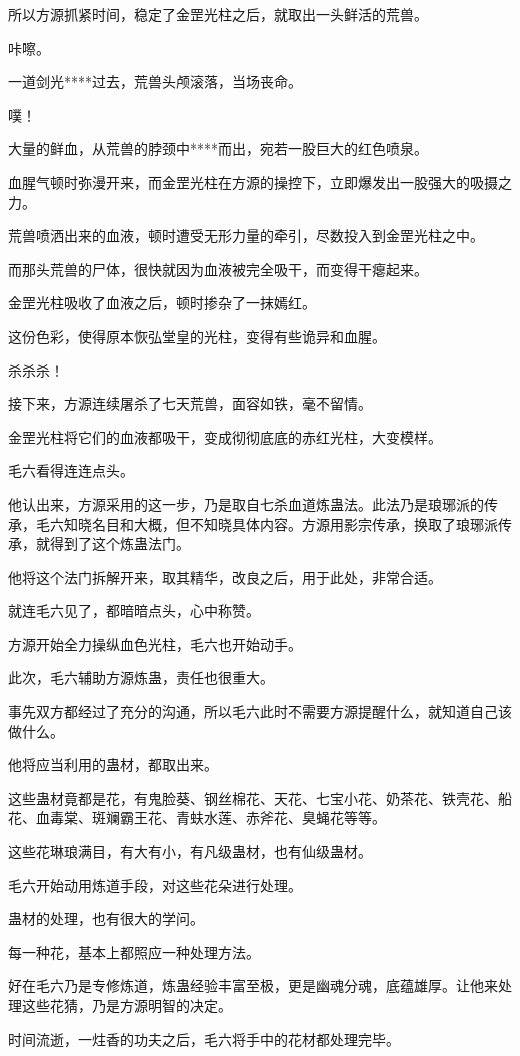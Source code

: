 \begin{this_body}
所以方源抓紧时间，稳定了金罡光柱之后，就取出一头鲜活的荒兽。

咔嚓。

一道剑光****过去，荒兽头颅滚落，当场丧命。

噗！

大量的鲜血，从荒兽的脖颈中****而出，宛若一股巨大的红色喷泉。

血腥气顿时弥漫开来，而金罡光柱在方源的操控下，立即爆发出一股强大的吸摄之力。

荒兽喷洒出来的血液，顿时遭受无形力量的牵引，尽数投入到金罡光柱之中。

而那头荒兽的尸体，很快就因为血液被完全吸干，而变得干瘪起来。

金罡光柱吸收了血液之后，顿时掺杂了一抹嫣红。

这份色彩，使得原本恢弘堂皇的光柱，变得有些诡异和血腥。

杀杀杀！

接下来，方源连续屠杀了七天荒兽，面容如铁，毫不留情。

金罡光柱将它们的血液都吸干，变成彻彻底底的赤红光柱，大变模样。

毛六看得连连点头。

他认出来，方源采用的这一步，乃是取自七杀血道炼蛊法。此法乃是琅琊派的传承，毛六知晓名目和大概，但不知晓具体内容。方源用影宗传承，换取了琅琊派传承，就得到了这个炼蛊法门。

他将这个法门拆解开来，取其精华，改良之后，用于此处，非常合适。

就连毛六见了，都暗暗点头，心中称赞。

方源开始全力操纵血色光柱，毛六也开始动手。

此次，毛六辅助方源炼蛊，责任也很重大。

事先双方都经过了充分的沟通，所以毛六此时不需要方源提醒什么，就知道自己该做什么。

他将应当利用的蛊材，都取出来。

这些蛊材竟都是花，有鬼脸葵、钢丝棉花、天花、七宝小花、奶茶花、铁壳花、船花、血毒棠、斑斓霸王花、青蚨水莲、赤斧花、臭蝇花等等。

这些花琳琅满目，有大有小，有凡级蛊材，也有仙级蛊材。

毛六开始动用炼道手段，对这些花朵进行处理。

蛊材的处理，也有很大的学问。

每一种花，基本上都照应一种处理方法。

好在毛六乃是专修炼道，炼蛊经验丰富至极，更是幽魂分魂，底蕴雄厚。让他来处理这些花猜，乃是方源明智的决定。

时间流逝，一炷香的功夫之后，毛六将手中的花材都处理完毕。


\end{this_body}
